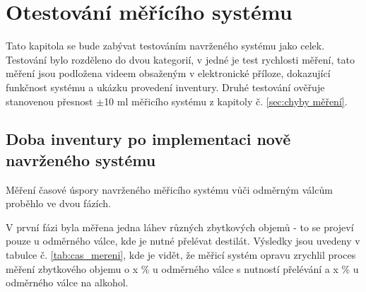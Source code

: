 


\chapter{Otestování měřícího systému}
Tato kapitola se bude zabývat testováním navrženého systému jako celek. Testování bylo rozděleno do dvou kategorií, v jedné je test rychlosti měření, tato měření jsou podložena videem obsaženým v elektronické příloze, dokazující funkčnost systému a ukázku provedení inventury. Druhé testování ověřuje stanovenou přesnost $\pm$10 ml měřicího systému z kapitoly č. \ref{sec:chyby měření}.



\section{Doba inventury po implementaci nově navrženého systému}

Měření časové úspory navrženého měřicího systému vůči odměrným válcům proběhlo ve dvou fázích.

V první fázi byla měřena jedna láhev různých zbytkových objemů - to se projeví pouze u odměrného válce, kde je nutné přelévat destilát. Výsledky jsou uvedeny v tabulce č. \ref{tab:cas_mereni}, kde je vidět, že měřicí systém opravu zrychlil proces měření zbytkového objemu o x \% u odměrného válce s nutností přelévání a x \% u odměrného válce na alkohol.


